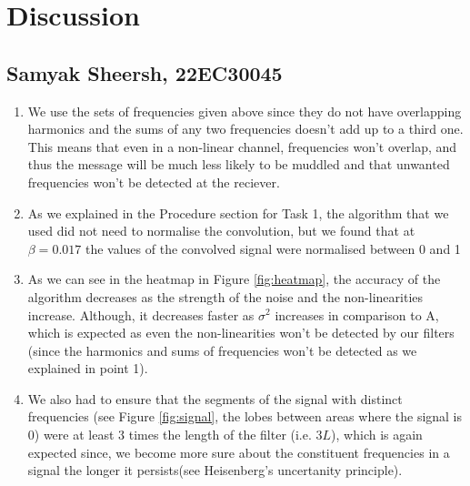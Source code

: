 \documentclass{article}
\begin{document}
\section{Discussion}
\subsection{Samyak Sheersh, 22EC30045}
\begin{enumerate}
  \item We use the sets of frequencies given above since they do not have overlapping harmonics and the sums of any two frequencies doesn't add up to a third one. This means that even in a non-linear channel, frequencies won't overlap, and thus the message will be much less likely to be muddled and that unwanted frequencies won't be detected at the reciever.
  \item As we explained in the Procedure section for Task 1, the algorithm that we used did not need to normalise the convolution, but we found that at $\beta=0.017$ the values of the convolved signal were normalised between 0 and 1 
  \item As we can see in the heatmap in Figure \ref{fig:heatmap}, the accuracy of the algorithm decreases as the strength of the noise and the non-linearities increase. Although, it decreases faster as $\sigma^2$ increases in comparison  to A, which is expected as even the non-linearities won't be detected by our filters (since the harmonics and sums of frequencies won't be detected as we explained in point 1). 
  \item We also had to ensure that the segments of the signal with distinct frequencies (see Figure \ref{fig:signal}, the lobes between areas where the signal is 0) were at least 3 times the length of the filter (i.e. $3L$), which is again expected since, we become more sure about the constituent frequencies in a signal the longer it persists(see Heisenberg's uncertanity principle). 

\end{enumerate}
\end{document}
